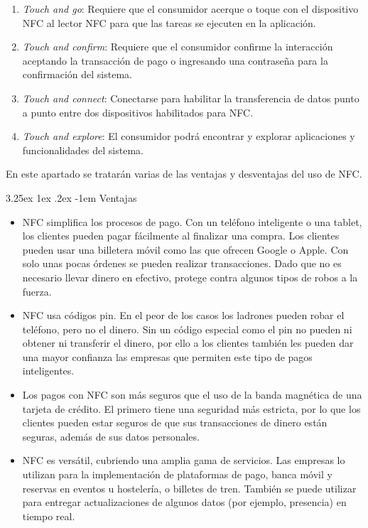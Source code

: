 \documentclass[12pt,a4paper,onecolumn,oneside]{report}
\makeatletter
\newcounter{subsubsubsection}[subsubsection]
\renewcommand\paragraph{\@startsection{paragraph}{5}{\z@}%
  {3.25ex \@plus1ex \@minus.2ex}%
  {-1em}%
  {\normalfont\normalsize\bfseries}}
\makeatother
\begin{document}
\begin{enumerate}

\item \textit{Touch and go}: Requiere que el consumidor acerque o toque con el dispositivo NFC al lector NFC para que las tareas se ejecuten en la aplicación. 
\item \textit{Touch and confirm}: Requiere que el consumidor confirme la interacción aceptando la transacción de pago o ingresando una contraseña para la confirmación del sistema.
\item \textit{Touch and connect}: Conectarse para habilitar la transferencia de datos punto a punto entre dos dispositivos habilitados para NFC. 
\item \textit{Touch and explore}: El consumidor podrá encontrar y explorar aplicaciones y funcionalidades del sistema.

\end{enumerate}


\label{Ventajas y desventajas}

En este apartado se tratarán varias de las ventajas y desventajas del uso de NFC.


\paragraph{Ventajas}
\begin{itemize}
\item NFC simplifica los procesos de pago. Con un teléfono inteligente o una tablet, los clientes pueden pagar fácilmente al finalizar una compra. Los clientes pueden usar una billetera móvil como las que ofrecen Google o Apple. Con solo unas pocas órdenes se pueden realizar transacciones. Dado que no es necesario llevar dinero en efectivo, protege contra algunos tipos de robos a la fuerza.
\item NFC usa códigos pin. En el peor de los casos los ladrones pueden robar el teléfono, pero no el dinero. Sin un código especial como el pin no pueden ni obtener ni transferir el dinero, por ello a los clientes también les pueden dar una mayor confianza las empresas que permiten este tipo de pagos inteligentes.
\item Los pagos con NFC son más seguros que el uso de la banda magnética de una tarjeta de crédito. El primero tiene una seguridad más estricta, por lo que los clientes pueden estar seguros de que sus transacciones de dinero están seguras, además de sus datos personales.
\item NFC es versátil, cubriendo una amplia gama de servicios. Las empresas lo utilizan para la implementación de plataformas de pago, banca móvil y reservas en eventos u hostelería, o billetes de tren. También se puede utilizar para entregar actualizaciones de algunos datos (por ejemplo, presencia) en tiempo real.
\end{itemize}
\end{document}
